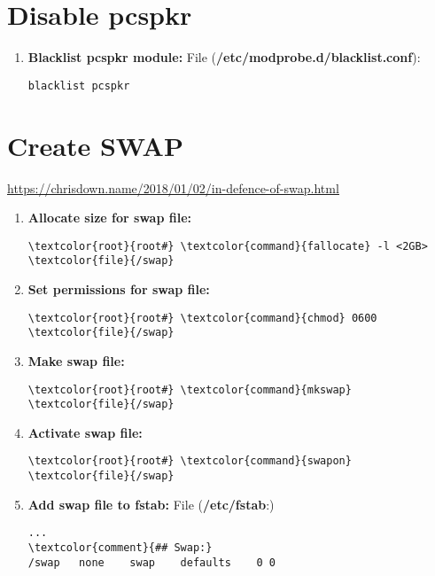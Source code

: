 \documentclass[10pt, a4paper, onecolumn, openany]{book} %
\begin{document}
\section{Disable pcspkr}
\begin{enumerate}
    \item \textbf{Blacklist pcspkr module:}
\newline File (\textbf{\textcolor{file}{/etc/modprobe.d/blacklist.conf}}):
\begin{Verbatim}[commandchars=\\\{\}]
blacklist pcspkr
\end{Verbatim}
\end{enumerate}
\section{Create SWAP}
\underline{\href{https://chrisdown.name/2018/01/02/in-defence-of-swap.html}{https://chrisdown.name/2018/01/02/in-defence-of-swap.html}}
\begin{enumerate}
    \item \textbf{Allocate size for swap file:}
\begin{Verbatim}[commandchars=\\\{\}]
\textcolor{root}{root#} \textcolor{command}{fallocate} -l <2GB> \textcolor{file}{/swap}
\end{Verbatim}
        \item \textbf{Set permissions for swap file:}
\begin{Verbatim}[commandchars=\\\{\}]
\textcolor{root}{root#} \textcolor{command}{chmod} 0600 \textcolor{file}{/swap}
\end{Verbatim}
    \item \textbf{Make swap file:}
\begin{Verbatim}[commandchars=\\\{\}]
\textcolor{root}{root#} \textcolor{command}{mkswap} \textcolor{file}{/swap}
\end{Verbatim}
    \item \textbf{Activate swap file:}
\begin{Verbatim}[commandchars=\\\{\}]
\textcolor{root}{root#} \textcolor{command}{swapon} \textcolor{file}{/swap}
\end{Verbatim}
    \item \textbf{Add swap file to fstab:}
\newline File (\textbf{\textcolor{file}{/etc/fstab}}:)    
\begin{Verbatim}[commandchars=\\\{\}]
...
\textcolor{comment}{## Swap:}
/swap   none    swap    defaults    0 0
\end{Verbatim}
\end{enumerate}
\end{document}
